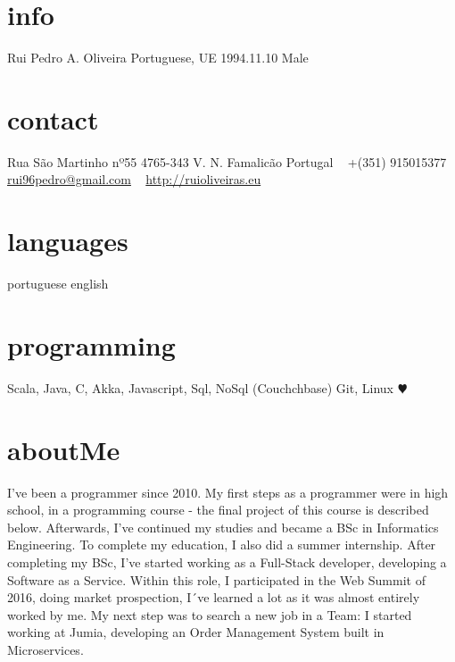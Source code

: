 \documentclass[]{friggeri-cv} %
\begin{document}


\begin{aside} %
\section{info}
Rui Pedro A. Oliveira
Portuguese, UE
1994.11.10
Male
\section{contact}
Rua São Martinho nº55
4765-343 V. N. Famalicão
Portugal
~
+(351) 915015377
~
\href{mailto:rui96pedro@gmail.com}{rui96pedro@gmail.com}
~
\href{http://ruioliveiras.eu}{http://ruioliveiras.eu}
~
\section{languages}
portuguese
english
\section{programming}
Scala, Java, C,
Akka,
Javascript,
Sql, NoSql (Couchchbase)
Git, Linux {\color{red} $\varheartsuit$}
~
\end{aside}

\section{aboutMe}
I’ve been a programmer since 2010. My first steps as a programmer were in high school, in a
programming course - the final project of this course is described below. Afterwards, I’ve continued my
studies and became a BSc in Informatics Engineering. To complete my education, I also did a summer
internship. After completing my BSc, I’ve started working as a Full-Stack developer, developing a Software
as a Service. Within this role, I participated in the Web Summit of 2016, doing market prospection, I´ve learned a lot as it was almost entirely worked by me. 
My next step was to search a new job in a Team: I started working at Jumia, developing an Order Management System built in Microservices.
\end{document}
